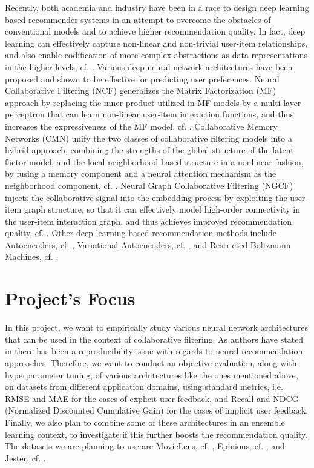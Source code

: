 Recently, both academia and industry have been in a race to design deep learning based recommender systems in an attempt to overcome the obstacles of conventional models and to achieve higher recommendation quality. In fact, deep learning can effectively capture non-linear and non-trivial user-item relationships, and also enable codification of more complex abstractions as data representations in the higher levels, cf. \cite{zhang2019deep}.
Various deep neural network architectures have been proposed and shown to be effective for predicting user preferences. Neural Collaborative Filtering (NCF) generalizes the Matrix Factorization (MF) approach by replacing the inner product utilized in MF models by a multi-layer perceptron that can learn non-linear user-item interaction functions, and thus increases the expressiveness of the MF model, cf. \cite{he2017neural}. Collaborative Memory Networks (CMN) unify the two classes of collaborative filtering models into a hybrid approach, combining the strengths of the global structure of the latent factor model, and the local neighborhood-based structure in a nonlinear fashion, by fusing a memory component and a neural attention mechanism as the neighborhood component, cf. \cite{ebesu2018collaborative}. Neural Graph Collaborative Filtering (NGCF) injects the collaborative signal into the embedding process by exploiting the user-item graph structure, so that it can effectively model high-order connectivity in the user-item interaction graph, and thus achieves improved recommendation quality, cf. \cite{wang2019neural}. Other deep learning based recommendation methods include Autoencoders, cf. \cite{sedhain2015autorec}, Variational Autoencoders, cf. \cite{liang2018variational}, and Restricted Boltzmann Machines, cf. \cite{salakhutdinov2007restricted}. 

\section*{Project's Focus}

In this project, we want to empirically study various neural network architectures that can be used in the context of collaborative filtering.
As authors have stated in \cite{dacrema2019we} there has been a reproducibility issue with regards to neural recommendation approaches. Therefore, we want to conduct an objective evaluation, along with hyperparameter tuning, of various architectures like the ones mentioned above, on datasets from different application domains, using standard metrics, i.e. RMSE and MAE for the cases of explicit user feedback, and Recall and NDCG (Normalized Discounted Cumulative Gain) for the cases of implicit user feedback. Finally, we also plan to combine some of these architectures in an ensemble learning context, to investigate if this further boosts the recommendation quality. The datasets we are planning to use are MovieLens, cf. \cite{harper2016movielens}, Epinions, cf. \cite{snapnets}, and Jester, cf. \cite{jester}.

